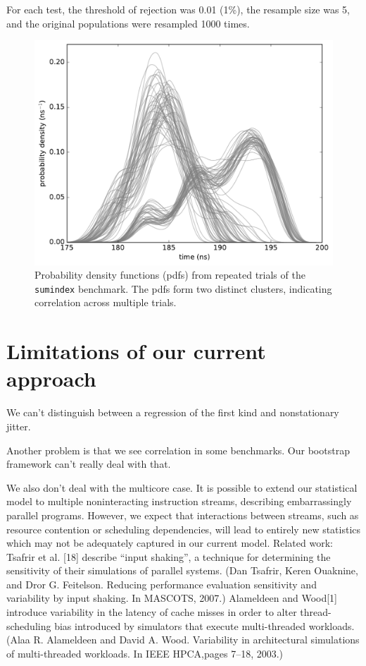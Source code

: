 \documentclass[conference]{IEEEtran}
\begin{document}
For each test, the threshold of rejection was 0.01 (1\%), the resample size was 5, and the original populations were resampled 1000 times.

\begin{figure}[!t]
\centering
\includegraphics[width=\columnwidth]{figures/fig4/kde_pdf_sumindex}
\caption{Probability density functions (pdfs) from repeated trials of the
\lstinline|sumindex| benchmark. The pdfs form two distinct clusters, indicating
correlation across multiple trials.}
\label{fig:pdfsumindex}
\end{figure}



\section{Limitations of our current approach}

We can't distinguish between a regression of the first kind and nonstationary jitter.

Another problem is that we see correlation in some benchmarks. Our bootstrap framework can't really deal with that.

We also don't deal with the multicore case. It is possible to extend our statistical
model to multiple noninteracting instruction streams, describing embarrassingly
parallel programs. However, we expect that interactions between streams, such as
resource contention or scheduling dependencies, will lead to entirely new
statistics which may not be adequately captured in our current model.
Related work:
Tsafrir et al. [18] describe “input shaking”, a technique for determining the sensitivity of their simulations of parallel systems. (Dan Tsafrir, Keren Ouaknine, and Dror G. Feitelson. Reducing performance evaluation sensitivity and variability by input shaking. In MASCOTS, 2007.)
Alameldeen and Wood[1] introduce variability in the latency of cache misses in order to alter thread-scheduling bias introduced by simulators that execute multi-threaded workloads. (Alaa R. Alameldeen and David A. Wood. Variability in architectural simulations of multi-threaded workloads. In IEEE HPCA,pages 7–18, 2003.)
\end{document}
